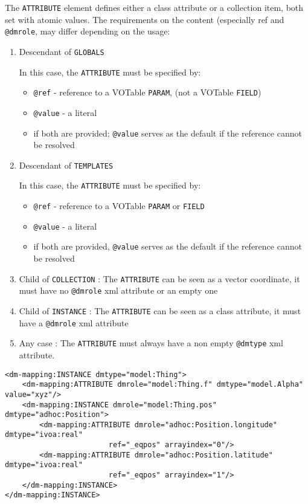 
The \texttt{ATTRIBUTE} element defines either a class attribute or a collection item, both set with atomic values.
The requirements on
the content (especially ref and  \texttt{@dmrole}, may differ depending on
the usage:


\begin{enumerate}
\item Descendant of \texttt{GLOBALS}

In this case, the \texttt{ATTRIBUTE} must be specified by:
  \begin{itemize} 
      \item \texttt{@ref} - reference to a VOTable \texttt{PARAM}, 
      (not a VOTable \texttt{FIELD})
      \item \texttt{@value} - a literal
      \item  if both are provided; \texttt{@value} serves as the default 
      if the reference cannot be resolved
  \end{itemize}  

  
\item Descendant of \texttt{TEMPLATES} 

In this case, the \texttt{ATTRIBUTE} must be specified by:
  \begin{itemize} 
      \item \texttt{@ref} - reference to a VOTable \texttt{PARAM} 
      or \texttt{FIELD}
      \item \texttt{@value} - a literal
      \item if both are provided, \texttt{@value} serves as the default if 
      the reference cannot be resolved
  \end{itemize}  

\item Child of \texttt{COLLECTION} :
    The \texttt{ATTRIBUTE} can be seen as a vector coordinate, 
    it must have  no \texttt{@dmrole} xml attribute or an empty one
    
\item Child of \texttt{INSTANCE} :
    The \texttt{ATTRIBUTE} can be seen as a class attribute, 
    it must have a \texttt{@dmrole} xml attribute
           
\item Any case :     
    The \texttt{ATTRIBUTE} must always have a non empty \texttt{@dmtype} xml attribute.
\end{enumerate}  
    
    
\begin{lstlisting}[frame=single,caption={ATTRIBUTE examples},style=XML,basicstyle=\tiny]
<dm-mapping:INSTANCE dmtype="model:Thing">
    <dm-mapping:ATTRIBUTE dmrole="model:Thing.f" dmtype="model.Alpha" value="xyz"/>		
    <dm-mapping:INSTANCE dmrole="model:Thing.pos" dmtype="adhoc:Position">
        <dm-mapping:ATTRIBUTE dmrole="adhoc:Position.longitude" dmtype="ivoa:real" 
                        ref="_eqpos" arrayindex="0"/>
        <dm-mapping:ATTRIBUTE dmrole="adhoc:Position.latitude" dmtype="ivoa:real" 
                        ref="_eqpos" arrayindex="1"/>
    </dm-mapping:INSTANCE>
</dm-mapping:INSTANCE>
\end{lstlisting}  


